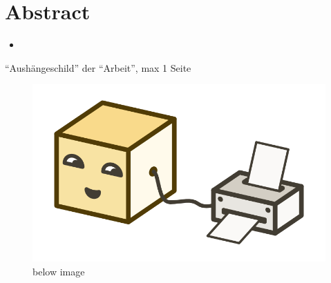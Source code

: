 \chapter*{Abstract}

\begin{itemize}
  \item {}
\end{itemize}


\enquote{Aushängeschild} der ``Arbeit'', max 1 Seite


\begin{figure}[ht]
  \centering
  \includegraphics[width=0.4\linewidth]{assets/illustration-microservice-printer.png}
  \caption[for list of figures]{below image}
\end{figure}
